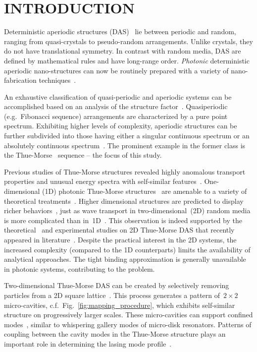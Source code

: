 \section{INTRODUCTION}
\label{sec:introduction_mapping}

Deterministic aperiodic structures (DAS)~\cite{2009_Barber} lie between periodic and random, ranging from quasi-crystals to pseudo-random arrangements. Unlike crystals, they do not have translational symmetry. In contrast with random media, DAS are defined by mathematical rules and have long-range order. {\it Photonic} deterministic aperiodic nano-structures can now be routinely prepared with a variety of nano-fabrication techniques~\cite{2011_Dal_Negro_DAS_review}.

An exhaustive classification of quasi-periodic and aperiodic systems can be accomplished based on an analysis of the structure factor~\cite{2010_Ivchenko}. Quasiperiodic (e.g.~Fibonacci sequence) arrangements are characterized by a pure point spectrum. Exhibiting higher levels of complexity, aperiodic structures can be further subdivided into those having either a singular continuous spectrum or an absolutely continuous spectrum~\cite{2006_Macia}. The prominent example in the former class is the Thue-Morse~\cite{1921_Morse} sequence -- the focus of this study. 
 
Previous studies of Thue-Morse structures revealed highly anomalous transport properties and unusual energy spectra with self-similar features~\cite{1988_Cheng_Thue_Morse,1989_Luck}. One-dimensional (1D) photonic Thue-Morse structures~\cite{1997_Liu,2004_Negro,2004_Qiu,2005_Agarwal,2005_Joannopoulos,2007_Agarwal} are amenable to a variety of theoretical treatments~\cite{2009_Barber,2010_Ivchenko}. Higher dimensional structures are predicted to display richer behaviors~\cite{2011_Dal_Negro_DAS_review}, just as wave transport in two-dimensional~(2D) random media is more complicated than in~1D~\cite{1979_Anderson}. This observation is indeed supported by the theoretical~\cite{2007_Moretti,2008_Boriskina} and  experimental studies on 2D Thue-Morse DAS that recently appeared in literature~\cite{2004_Negro,2007_Agarwal,2009_Boriskina,2007_Matsui,2008_Gopinath_DAS,2011_Cao_DAS}. Despite the practical interest in the 2D systems, the increased complexity (compared to the 1D counterparts) limits the availability of analytical approaches. The tight binding approximation is generally unavailable in photonic systems, contributing to the problem.

Two-dimensional Thue-Morse DAS can be created by selectively removing particles from a 2D square lattice~\cite{2011_Dal_Negro_DAS_review,2008_Gopinath_DAS}. This process generates a pattern of~$2\times2$ micro-cavities, c.f.~Fig.~\ref{fig:mapping_procedure}, which exhibits self-similar structure on progressively larger scales. These micro-cavities can support confined modes~\cite{2007_Moretti,2008_Boriskina}, similar to whispering gallery modes of micro-disk resonators. Patterns of coupling between the cavity modes in the Thue-Morse structure plays an important role in determining the lasing mode profile~\cite{2011_Cao_DAS}. 

